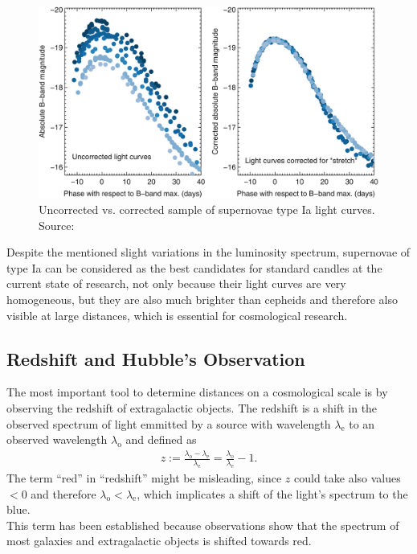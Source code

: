 \begin{figure}[H]
    \centering
    \includegraphics[scale=0.35]{figures/images/supernovae-stretch.png}
    \caption{Uncorrected vs. corrected sample of supernovae type Ia light curves. \\ 
    Source: \cite[p.~298, Figure 2]{Maguire2017}} 
\end{figure}

\noindent Despite the mentioned slight variations in the luminosity spectrum, supernovae of type Ia can be considered as the best candidates for standard candles at the current state of research, not only because their light curves are very homogeneous, but they are also much brighter than cepheids and therefore also visible at large distances, which is essential for cosmological research.


\subsection{Redshift and Hubble's Observation}

The most important tool to determine distances on a cosmological scale is by observing the redshift of extragalactic objects. The redshift is a shift in the observed spectrum of light emmitted by a source with wavelength $\lambda_{\text{e}}$ to an observed wavelength $\lambda_{\text{o}}$ and defined as
\begin{align}
    z := \frac{\lambda_{\text{o}} - \lambda_{\text{e}}}{\lambda_{\text{e}}} = \frac{\lambda_{\text{o}}}{\lambda_{\text{e}}} - 1. \label{eq:redshift}
\end{align}
The term ``red'' in ``redshift'' might be misleading, since $z$ could take also values $<0$ and therefore $\lambda_{\text{o}} < \lambda_{\text{e}}$, which implicates a shift of the light's spectrum to the blue. \\
This term has been established because observations show that the spectrum of most galaxies and extragalactic objects is shifted towards red. \\

